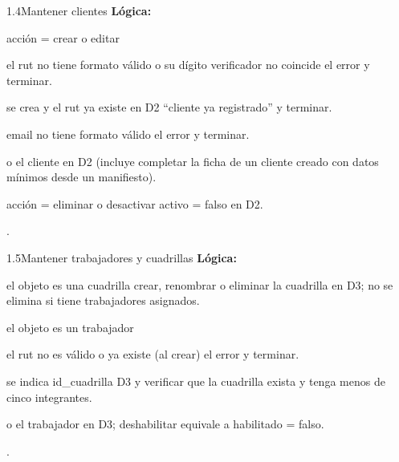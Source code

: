 \begin{minispec}{1.4}{Mantener clientes}
\textbf{Lógica:}
\begin{logica}
    \item {} acción = crear o editar 
    \begin{logica}
        \item {} el rut no tiene formato válido o su dígito verificador no coincide
         el error y terminar.
        \item {} se crea y el rut ya existe en D2  ``cliente ya
        registrado'' y terminar.
        \item {} email no tiene formato válido  el error y terminar.
        \item {} o  el cliente en D2 (incluye completar la ficha de
        un cliente creado con datos mínimos desde un manifiesto).
    \end{logica}
    \item {} acción = eliminar o desactivar  activo = falso en D2.
    \item {} .
\end{logica}
\end{minispec}

\begin{minispec}{1.5}{Mantener trabajadores y cuadrillas}
\textbf{Lógica:}
\begin{logica}
    \item {} el objeto es una cuadrilla  crear, renombrar o eliminar la
    cuadrilla en D3; no se elimina si tiene trabajadores asignados.
    \item {} el objeto es un trabajador 
    \begin{logica}
        \item {} el rut no es válido o ya existe (al crear)  el error
        y terminar.
        \item {} se indica id\_cuadrilla  D3 y verificar que la
        cuadrilla exista y tenga menos de cinco integrantes.
        \item {} o  el trabajador en D3; deshabilitar equivale a
         habilitado = falso.
    \end{logica}
    \item {} .
\end{logica}
\end{minispec}

